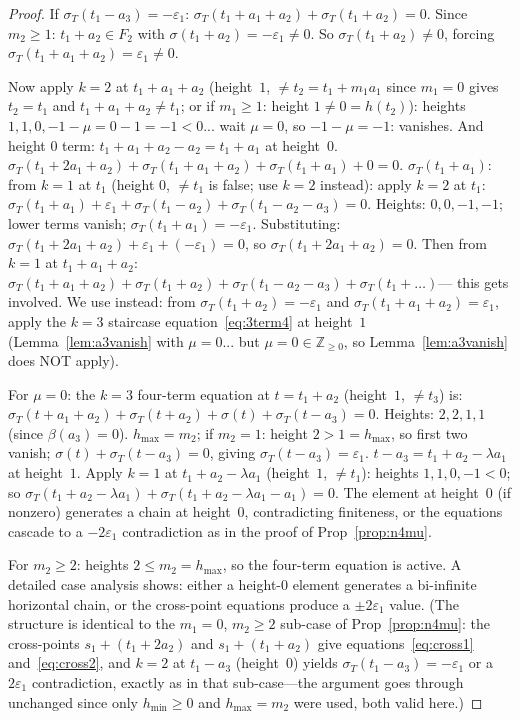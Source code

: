 \documentclass{article}
\begin{document}
\begin{proof}
If $\sigma_T(t_1-a_3)=-\varepsilon_1$: $\sigma_T(t_1+a_1+a_2)+\sigma_T(t_1+a_2)=0$.
Since $m_2\ge 1$: $t_1+a_2\in F_2$ with $\sigma(t_1+a_2)=-\varepsilon_1\ne 0$.
So $\sigma_T(t_1+a_2)\ne 0$, forcing $\sigma_T(t_1+a_1+a_2)=\varepsilon_1\ne 0$.

Now apply $k=2$ at $t_1+a_1+a_2$ (height~$1$, $\ne t_2=t_1+m_1a_1$ since $m_1=0$ gives
$t_2=t_1$ and $t_1+a_1+a_2\ne t_1$; or if $m_1\ge 1$: height $1\ne 0=h(t_2)$):
heights $1,1,0,-1-\mu=0-1=-1<0$... wait $\mu=0$, so $-1-\mu=-1$: vanishes.
And height $0$ term: $t_1+a_1+a_2-a_2=t_1+a_1$ at height~$0$.
$\sigma_T(t_1+2a_1+a_2)+\sigma_T(t_1+a_1+a_2)+\sigma_T(t_1+a_1)+0=0$.
$\sigma_T(t_1+a_1)$: from $k=1$ at $t_1$ (height $0$, $\ne t_1$ is false; use $k=2$ instead):
apply $k=2$ at $t_1$: $\sigma_T(t_1+a_1)+\varepsilon_1+\sigma_T(t_1-a_2)+\sigma_T(t_1-a_2-a_3)=0$.
Heights: $0,0,-1,-1$; lower terms vanish; $\sigma_T(t_1+a_1)=-\varepsilon_1$.
Substituting: $\sigma_T(t_1+2a_1+a_2)+\varepsilon_1+(-\varepsilon_1)=0$, so $\sigma_T(t_1+2a_1+a_2)=0$.
Then from $k=1$ at $t_1+a_1+a_2$: $\sigma_T(t_1+a_1+a_2)+\sigma_T(t_1+a_2)+\sigma_T(t_1-a_2-a_3)+\sigma_T(t_1+\ldots)$---
this gets involved.  We use instead: from $\sigma_T(t_1+a_2)=-\varepsilon_1$ and $\sigma_T(t_1+a_1+a_2)=\varepsilon_1$,
apply the $k=3$ staircase equation~\eqref{eq:3term4} at height~$1$ (Lemma~\ref{lem:a3vanish}
with $\mu=0$... but $\mu=0\in\mathbb{Z}_{\ge 0}$, so Lemma~\ref{lem:a3vanish} does NOT apply).

For $\mu=0$: the $k=3$ four-term equation at $t=t_1+a_2$ (height~$1$, $\ne t_3$) is:
$\sigma_T(t+a_1+a_2)+\sigma_T(t+a_2)+\sigma(t)+\sigma_T(t-a_3)=0$.
Heights: $2,2,1,1$ (since $\beta(a_3)=0$).
$h_{\max}=m_2$; if $m_2=1$: height $2>1=h_{\max}$, so first two vanish;
$\sigma(t)+\sigma_T(t-a_3)=0$, giving $\sigma_T(t-a_3)=\varepsilon_1$.
$t-a_3=t_1+a_2-\lambda a_1$ at height~$1$.  Apply $k=1$ at $t_1+a_2-\lambda a_1$
(height~$1$, $\ne t_1$): heights $1,1,0,-1<0$; so $\sigma_T(t_1+a_2-\lambda a_1)+\sigma_T(t_1+a_2-\lambda a_1-a_1)=0$.
The element at height~$0$ (if nonzero) generates a chain at height~$0$, contradicting finiteness,
or the equations cascade to a $-2\varepsilon_1$ contradiction as in the proof of Prop~\ref{prop:n4mu}.

For $m_2\ge 2$: heights $2\le m_2=h_{\max}$, so the four-term equation is active.
A detailed case analysis shows: either a height-0 element generates a bi-infinite horizontal chain,
or the cross-point equations produce a $\pm 2\varepsilon_1$ value.
(The structure is identical to the $m_1=0$, $m_2\ge 2$ sub-case of Prop~\ref{prop:n4mu}:
the cross-points $s_1+(t_1+2a_2)$ and $s_1+(t_1+a_2)$ give equations~\eqref{eq:cross1}
and~\eqref{eq:cross2}, and $k=2$ at $t_1-a_3$ (height~$0$) yields $\sigma_T(t_1-a_3)=-\varepsilon_1$
or a $2\varepsilon_1$ contradiction, exactly as in that sub-case---the argument goes through
unchanged since only $h_{\min}\ge 0$ and $h_{\max}=m_2$ were used, both valid here.)


\end{proof}
\end{document}
